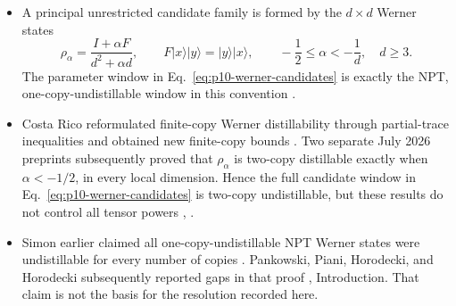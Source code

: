 \begin{itemize}
  \item A principal unrestricted candidate family is formed by the
  $d\times d$ Werner states
  \begin{equation}
    \rho_\alpha=\frac{I+\alpha F}{d^2+\alpha d},
    \qquad
    F\lvert x\rangle\lvert y\rangle
      =\lvert y\rangle\lvert x\rangle,
    \qquad
    -\frac12\leq\alpha<-\frac1d,\quad d\geq3.
    \label{eq:p10-werner-candidates}
  \end{equation}
  The parameter window in Eq.~\eqref{eq:p10-werner-candidates} is exactly the
  NPT, one-copy-undistillable window in this convention
  .

  \newpage

  \item Costa Rico reformulated finite-copy Werner distillability through
  partial-trace inequalities and obtained new finite-copy bounds
  .  Two separate July 2026 preprints
  subsequently proved that $\rho_\alpha$ is two-copy distillable exactly when
  $\alpha<-1/2$, in every local dimension.  Hence the full candidate window
  in Eq.~\eqref{eq:p10-werner-candidates} is two-copy undistillable, but these
  results do not control all tensor powers
  ,
  .

  \item Simon earlier claimed all one-copy-undistillable NPT Werner states
were undistillable for every number of copies
. Pankowski, Piani, Horodecki, and
Horodecki subsequently reported gaps in that proof
, Introduction.
That claim is not the basis for the resolution recorded here.


\end{itemize}

